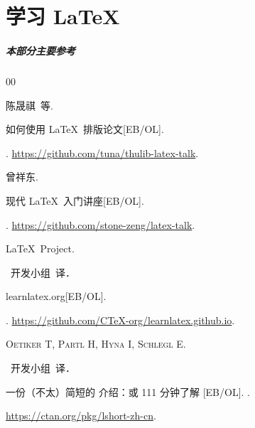 
\part{学习 \LaTeX{}}



\begin{frame}

  \frametitle{本部分主要参考}

  \begin{bibliolist}{00}

    \onlineitem 陈晟祺~等.

    \newblock 如何使用 \LaTeX\ 排版论文[EB/OL].

    . \url{https://github.com/tuna/thulib-latex-talk}.

    \onlineitem 曾祥东.

    \newblock 现代 \LaTeX\ 入门讲座[EB/OL].

    . \url{https://github.com/stone-zeng/latex-talk}.

    \onlineitem \LaTeX\ Project.

    \CTeX\ 开发小组~译．

    \newblock learnlatex.org[EB/OL].

    . \url{https://github.com/CTeX-org/learnlatex.github.io}.

    \onlineitem \textsc{Oetiker T}, \textsc{Partl H}, \textsc{Hyna I}, \textsc{Schlegl E}.

    \CTeX\ 开发小组~译．

    \newblock 一份（不太）简短的 \LaTeXe{} 介绍：或 111 分钟了解 \LaTeXe{}[EB/OL]. \newblock{}.

    \url{https://ctan.org/pkg/lshort-zh-cn}.

  \end{bibliolist}


\end{frame}

